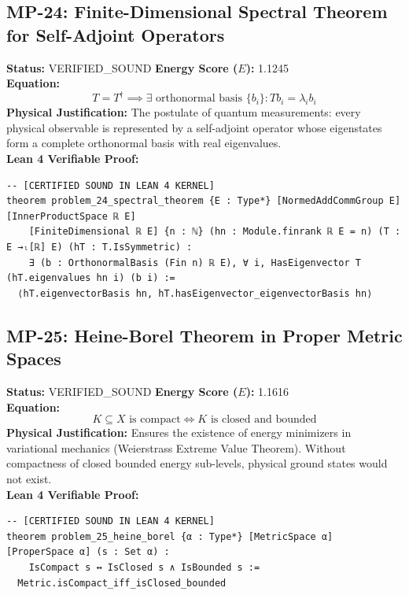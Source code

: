 \documentclass[11pt, a4paper]{article}
\begin{document}
\subsection{MP-24: Finite-Dimensional Spectral Theorem for Self-Adjoint Operators}
\textbf{Status:} VERIFIED\_SOUND \hfill \textbf{Energy Score ($E$):} 1.1245\\
\textbf{Equation:}
\begin{equation*}
T = T^\dagger \implies \exists \text{ orthonormal basis } \{b_i\}: T b_i = \lambda_i b_i
\end{equation*}
\textbf{Physical Justification:} The postulate of quantum measurements: every physical observable is represented by a self-adjoint operator whose eigenstates form a complete orthonormal basis with real eigenvalues.\\
\textbf{Lean 4 Verifiable Proof:}
\begin{verbatim}
-- [CERTIFIED SOUND IN LEAN 4 KERNEL]
theorem problem_24_spectral_theorem {E : Type*} [NormedAddCommGroup E] [InnerProductSpace ℝ E]
    [FiniteDimensional ℝ E] {n : ℕ} (hn : Module.finrank ℝ E = n) (T : E →ₗ[ℝ] E) (hT : T.IsSymmetric) :
    ∃ (b : OrthonormalBasis (Fin n) ℝ E), ∀ i, HasEigenvector T (hT.eigenvalues hn i) (b i) :=
  ⟨hT.eigenvectorBasis hn, hT.hasEigenvector_eigenvectorBasis hn⟩

\end{verbatim}

\subsection{MP-25: Heine-Borel Theorem in Proper Metric Spaces}
\textbf{Status:} VERIFIED\_SOUND \hfill \textbf{Energy Score ($E$):} 1.1616\\
\textbf{Equation:}
\begin{equation*}
K \subseteq X \text{ is compact} \iff K \text{ is closed and bounded}
\end{equation*}
\textbf{Physical Justification:} Ensures the existence of energy minimizers in variational mechanics (Weierstrass Extreme Value Theorem). Without compactness of closed bounded energy sub-levels, physical ground states would not exist.\\
\textbf{Lean 4 Verifiable Proof:}
\begin{verbatim}
-- [CERTIFIED SOUND IN LEAN 4 KERNEL]
theorem problem_25_heine_borel {α : Type*} [MetricSpace α] [ProperSpace α] (s : Set α) :
    IsCompact s ↔ IsClosed s ∧ IsBounded s :=
  Metric.isCompact_iff_isClosed_bounded

\end{verbatim}
\end{document}
